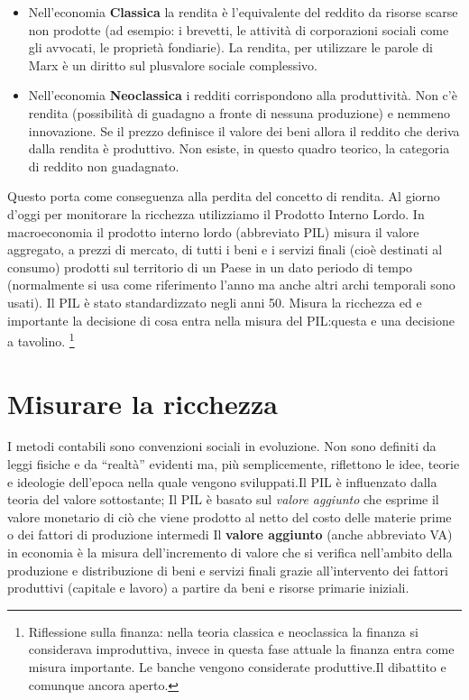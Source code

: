 \documentclass{article}
\begin{document}
\begin{itemize}
    \item Nell’economia \textbf{Classica} la rendita è l’equivalente del reddito da risorse scarse non prodotte
(ad esempio: i brevetti, le attività di corporazioni sociali come gli avvocati, le proprietà
fondiarie). La rendita, per utilizzare le parole di Marx è un diritto sul plusvalore sociale
complessivo.
\item Nell’economia \textbf{Neoclassica} i redditi corrispondono alla produttività. Non c’è rendita
(possibilità di guadagno a fronte di nessuna produzione) e nemmeno innovazione.
Se il prezzo definisce il valore dei beni allora il reddito che deriva dalla rendita è produttivo.
Non esiste, in questo quadro teorico, la categoria di reddito non guadagnato. 
\end{itemize}

Questo porta come conseguenza alla perdita del concetto di rendita.
Al giorno d'oggi per monitorare la ricchezza utilizziamo il Prodotto Interno Lordo.
In macroeconomia il prodotto interno lordo (abbreviato PIL) misura il valore aggregato, a prezzi di mercato, di tutti i beni e i servizi finali (cioè destinati al consumo) prodotti sul territorio di un Paese in un dato periodo di tempo (normalmente si usa come riferimento l’anno ma anche altri archi temporali sono usati).
Il PIL  è stato standardizzato negli anni 50. Misura la ricchezza ed e importante la decisione di cosa entra nella
misura del PIL:questa e una decisione a tavolino. 
\footnote{Riflessione sulla finanza: nella teoria  classica e neoclassica la  finanza si considerava  improduttiva, invece in questa fase attuale la finanza entra come misura importante. Le banche vengono considerate produttive.Il dibattito e comunque ancora aperto.}  

\section{Misurare la ricchezza}
I metodi contabili sono convenzioni sociali in evoluzione.
Non sono definiti da leggi fisiche e da “realtà” evidenti ma,
più semplicemente, riflettono le idee, teorie e ideologie
dell’epoca nella quale vengono sviluppati.Il PIL è influenzato dalla teoria del valore sottostante;
Il PIL è basato sul \textit{valore aggiunto} che esprime il valore
monetario di ciò che viene prodotto al netto del costo
delle materie prime o dei fattori di produzione intermedi 
Il \textbf{valore aggiunto} (anche abbreviato VA) in economia è la misura dell'incremento di valore che si verifica nell'ambito della produzione e distribuzione di beni e servizi finali grazie all'intervento dei fattori produttivi (capitale e lavoro) a partire da beni e risorse primarie iniziali.
\end{document}
